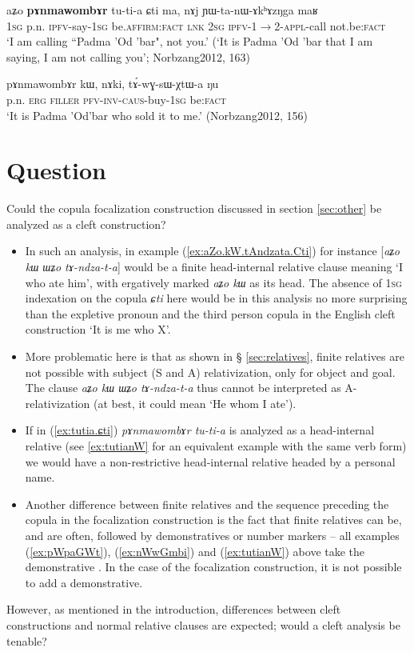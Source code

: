 \documentclass[oneside,a4paper,11pt]{article}
\newcommand{\ipa}[1]{{\phon{#1}}}
\newcommand{\fl}{$\rightarrow$}
\begin{document}
\begin{exe}
\ex \label{ex:tutia.ɕti}
\gll aʑo \textbf{pɤnmawombɤr} tu-ti-a ɕti ma, nɤj ɲɯ-ta-nɯ-ɤkʰɤzŋga maʁ  \\
\textsc{1sg} p.n. \textsc{ipfv}-say-\textsc{1sg} be.\textsc{affirm}:\textsc{fact} \textsc{lnk} \textsc{2sg} \textsc{ipfv}-1\fl{}2-\textsc{appl}-call not.be:\textsc{fact} \\
\glt `I am calling ``Padma 'Od 'bar", not you.' (`It is Padma 'Od 'bar that I am saying, I am not calling you'; Norbzang2012, 163)
\end{exe}

\begin{exe}
\ex \label{ex:tAwGsWXtWa}
\gll pɤnmawombɤr kɯ, nɤki, tɤ́-wɣ-sɯ-χtɯ-a ŋu \\
p.n. \textsc{erg} \textsc{filler} \textsc{pfv}-\textsc{inv}-\textsc{caus}-buy-\textsc{1sg} be:\textsc{fact} \\
\glt `It is Padma 'Od'bar who sold it to me.' (Norbzang2012, 156)
\end{exe}

\section{Question}
Could the copula focalization construction discussed in section \ref{sec:other} be analyzed as a cleft construction? 
\begin{itemize}
\item In such an analysis, in example (\ref{ex:aZo.kW.tAndzata.Cti}) for instance  [\textit{aʑo kɯ ɯʑo tɤ-ndza-t-a}] would be a finite head-internal relative clause meaning `I who ate him', with ergatively marked \textit{aʑo kɯ} as its head. The absence of \textsc{1sg} indexation on the copula \textit{ɕti} here would be in this analysis no more surprising than the expletive pronoun and the third person copula in the English cleft construction `It is me who X'. 
\item More problematic here is that as shown in § \ref{sec:relatives}, finite relatives are not possible with subject (S and A) relativization, only for object and goal. The clause \textit{aʑo kɯ ɯʑo tɤ-ndza-t-a} thus cannot be interpreted as A-relativization (at best, it could mean `He whom I ate'). 
\item If in (\ref{ex:tutia.ɕti}) \textit{pɤnmawombɤr tu-ti-a} is analyzed as a head-internal relative (see \ref{ex:tutianW} for an equivalent example with the same verb form) we would have a non-restrictive head-internal relative headed by a personal name.
\item Another difference between finite relatives and the sequence preceding the copula in the focalization construction is the fact that finite relatives can be, and are often, followed by demonstratives or number markers -- all examples (\ref{ex:pWpaGWt}),  (\ref{ex:nWwGmbi}) and (\ref{ex:tutianW}) above take the demonstrative \ipa{nɯ}. In the case of the focalization construction, it is not possible to add a demonstrative.
\end{itemize}
However, as mentioned in the introduction, differences between cleft constructions and normal relative clauses are expected; would a cleft analysis be tenable?
\end{document}
